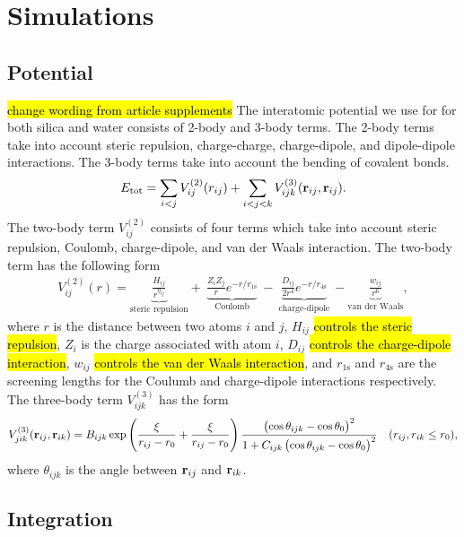\chapter{Simulations}
\section{Potential}
\hl{change wording from article supplements}
The interatomic potential we use for for both silica and water consists of 2-body and 3-body terms. The 2-body terms take into account steric repulsion, charge-charge, charge-dipole, and dipole-dipole interactions. The 3-body terms take into account the bending of covalent bonds.
\begin{align*}
    E_\text{tot} = \sum_{i<j} V_{ij}^{(2)}(r_{ij}) + \sum_{i<j<k}V_{ijk}^{(3)}(\mathbf{r}_{ij}, \mathbf{r}_{ij}).
\end{align*}
The two-body term $V_{ij}^{(2)}$ consists of four terms which take into account steric repulsion, Coulomb, charge-dipole, and van der Waals interaction. The two-body term has the following form
\begin{align*}
    V_{ij}^{(2)} (r) = 
    \underbrace{
        \frac{H_{ij}}{r^{\eta_{ij}}}
    }_{\text{steric repulsion}}
    +~ 
    \underbrace{
        \frac{Z_iZ_j}{r}e^{-r/r_{1\text{s}}}
    }_{\text{Coulomb}}
    ~-~
    \underbrace{
        \frac{D_{ij}}{2r^4}e^{-r/r_{4\text{s}}}
    }_{\text{charge-dipole}}
    ~- 
    \underbrace{
        \frac{w_{ij}}{r^6}
    }_{\text{van der Waals}}
    ,
\end{align*}
where $r$ is the distance between two atoms $i$ and $j$, $H_{ij}$ \hl{controls the steric repulsion}, $Z_i$ is the charge associated with atom $i$, $D_{ij}$ \hl{controls the charge-dipole interaction}, $w_{ij}$ \hl{controls the van der Waals interaction}, and $r_{1\text{s}}$ and $r_{4\text{s}}$ are the screening lengths for the Coulumb and charge-dipole interactions respectively. The three-body term $V_{ijk}^{(3)}$ has the form
\begin{align*}
    &V^{(3)}_{jik}(\mathbf{r}_{ij}, \mathbf{r}_{ik}) = B_{ijk} \exp\left( \frac{\xi}{r_{ij} - r_0} + \frac{\xi}{r_{ij} - r_0} \right) \frac{\left(\cos\theta_{ijk} - \cos\theta_0\right)^2}{1 + C_{ijk}\left(\cos\theta_{ijk} - \cos\theta_0\right)^2} &(r_{ij}, r_{ik} \leq r_0),
\end{align*}
where $\theta_{ijk}$ is the angle between $\mathbf{r}_{ij}$ and $\mathbf{r}_{ik}$.

\section{Integration}


